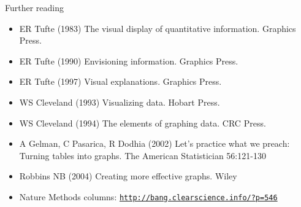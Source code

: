 \documentclass[12pt]{article}
\newcommand{\headsize}{\fontsize{35}{35} \selectfont}
\newcommand{\smallestsize}{\fontsize{18}{22} \selectfont}
\begin{document}
\newpage


\headsize \color{yellow}
\hfill \begin{minipage}{5.75in}
\centering
Further reading
\end{minipage}

\vspace{30mm}
\smallestsize \color{white}

\hspace{0.5in} \begin{minipage}[t]{9in}
\begin{itemize}

\itemsep12pt

\item ER Tufte (1983) The visual display of quantitative information.
Graphics Press.
\item ER Tufte (1990) Envisioning information. Graphics Press.
\item ER Tufte (1997) Visual explanations. Graphics Press.

\vspace*{8mm}

\item WS Cleveland (1993) Visualizing data. Hobart Press.
\item WS Cleveland (1994) The elements of graphing data. CRC Press.

\vspace*{8mm}

\item A Gelman, C Pasarica, R Dodhia (2002) Let's practice what we preach:
Turning tables into graphs. The American Statistician 56:121-130

\vspace*{8mm}

\item Robbins NB (2004) Creating more effective graphs. Wiley

\vspace*{8mm}

\item Nature Methods columns: \href{http://bang.clearscience.info/?p=546}{\tt http://bang.clearscience.info/?p=546}

\end{itemize}
\end{minipage}
\end{document}
